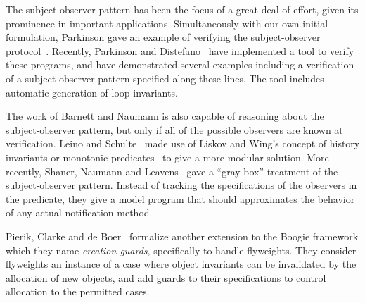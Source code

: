 The subject-observer pattern has been the focus of a great deal of effort,
given its prominence in important applications. Simultaneously with our own
initial formulation, Parkinson gave an example of verifying the
subject-observer protocol~\cite{parkinson-so}. Recently, Parkinson and
Distefano~\cite{jstar-parkinson-distefano} have implemented a tool to verify
these programs, and have demonstrated several examples including a verification
of a subject-observer pattern specified along these lines. The tool includes
automatic generation of loop invariants. 

The work of Barnett and Naumann is also capable of reasoning about the
subject-observer pattern, but only if all of the possible observers
are known at verification.  Leino and Schulte~\cite{boogie-sub-obs}
made use of Liskov and Wing's concept of history invariants or
monotonic predicates~\cite{liskov-wing} to give a more modular
solution. More recently, Shaner, Naumann and Leavens~\cite{ShanerLN07}
gave a ``gray-box'' treatment of the subject-observer pattern.
Instead of tracking the specifications of the observers in the
predicate, they give a model program that should approximates the
behavior of any actual notification method.

Pierik, Clarke and de Boer~\cite{creational-invariants} formalize another
extension to the Boogie framework which they name \emph{creation
  guards}, specifically to handle flyweights. They consider flyweights
an instance of a case where object invariants can be invalidated by
the allocation of new objects, and add guards to their specifications
to control allocation to the permitted cases. 



